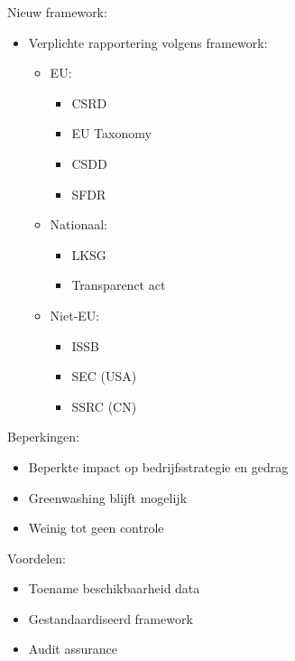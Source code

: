 \documentclass[12pt]{article}
\begin{document}
Nieuw framework:\begin{itemize}
    \item Verplichte rapportering volgens framework:\begin{itemize}
        \item EU:\begin{itemize}
            \item CSRD 
            \item EU Taxonomy 
            \item CSDD 
            \item SFDR
        \end{itemize} 
        \item Nationaal:\begin{itemize}
            \item LKSG 
            \item Transparenct act
        \end{itemize}
        \item Niet-EU:\begin{itemize}
            \item ISSB 
            \item SEC (USA) 
            \item SSRC (CN)
        \end{itemize}
    \end{itemize}
\end{itemize}
Beperkingen:\begin{itemize}
    \item Beperkte impact op bedrijfsstrategie en gedrag 
    \item Greenwashing blijft mogelijk 
    \item Weinig tot geen controle
\end{itemize}
Voordelen:\begin{itemize}
    \item Toename beschikbaarheid data 
    \item Gestandaardiseerd framework 
    \item Audit assurance
\end{itemize}
\end{document}
